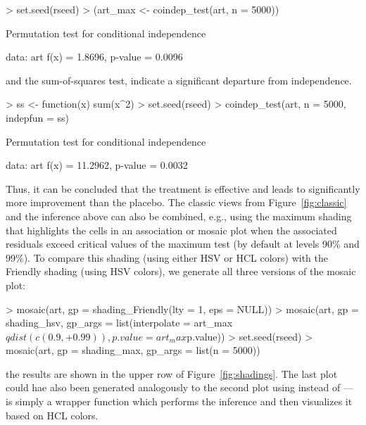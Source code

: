 \documentclass{Z}
\begin{document}
\begin{Schunk}
\begin{Sinput}
> set.seed(rseed)
> (art_max <- coindep_test(art, n = 5000))
\end{Sinput}
\begin{Soutput}
	Permutation test for conditional independence

data:  art 
f(x) = 1.8696, p-value = 0.0096
\end{Soutput}
\end{Schunk}

and the sum-of-squares test, indicate a significant departure from independence. 

\begin{Schunk}
\begin{Sinput}
> ss <- function(x) sum(x^2)
> set.seed(rseed)
> coindep_test(art, n = 5000, indepfun = ss)
\end{Sinput}
\begin{Soutput}
	Permutation test for conditional independence

data:  art 
f(x) = 11.2962, p-value = 0.0032
\end{Soutput}
\end{Schunk}

Thus, it can be concluded that the treatment is effective and leads to significantly more
improvement than the placebo. The classic views from Figure~\ref{fig:classic} and the inference
above can also be combined, e.g., using the maximum shading that highlights the cells in
an association or mosaic plot when the associated residuals exceed critical values of the
maximum test (by default at levels 90\% and 99\%). To compare this shading (using either HSV
or HCL colors) with the Friendly shading (using HSV colors), we generate all three versions
of the mosaic plot:

\begin{Schunk}
\begin{Sinput}
> mosaic(art, gp = shading_Friendly(lty = 1, eps = NULL))
> mosaic(art, gp = shading_hsv, gp_args = list(interpolate = art_max$qdist(c(0.9, 
+     0.99)), p.value = art_max$p.value))
> set.seed(rseed)
> mosaic(art, gp = shading_max, gp_args = list(n = 5000))
\end{Sinput}
\end{Schunk}

the  results are shown in the upper row of Figure~\ref{fig:shadings}. The last plot could
hae also been generated analogously to the second plot using  instead of
--- is simply a wrapper function which performs the
inference and then visualizes it based on HCL colors.
\end{document}

